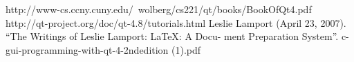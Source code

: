 \begin{thebibliography}{9}
\bibitem{} http://www-cs.ccny.cuny.edu/~wolberg/cs221/qt/books/BookOfQt4.pdf
\bibitem{} http://qt-project.org/doc/qt-4.8/tutorials.html
\bibitem{} Leslie Lamport (April 23, 2007). “The Writings of Leslie Lamport: LaTeX: A Docu-
ment Preparation System”.
\bibitem{} c-gui-programming-with-qt-4-2ndedition (1).pdf
 
\end{thebibliography}
